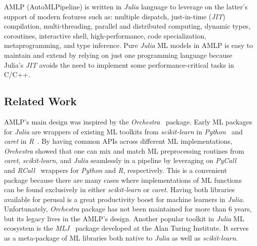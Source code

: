 \documentclass{juliacon}
\begin{document}
AMLP (AutoMLPipeline) is written in \emph{Julia} language \cite{bezanson2017julia} to leverage on the
latter's support of modern features such as: multiple dispatch, just-in-time
(\emph{JIT}) compilation, multi-threading, parallel and distributed computing,
dynamic types, coroutines, interactive shell, high-performance, code specialization,
metaprogramming, and type inference.  Pure \emph{Julia} ML models in AMLP is
easy to maintain and extend by relying on just one programming language
because Julia's \emph{JIT} avoids the need to implement some
performance-critical tasks in C/C++.

\subsection{Related Work}
\label{relatedwork}

AMLP's main design was inspired by the
\emph{Orchestra}~\cite{orchestra2014} package.  Early ML packages for
\emph{Julia} are wrappers of existing ML toolkits from \emph{scikit-learn}  in
\emph{Python}~\cite{python95} and \emph{caret} in \emph{R}~\cite{r13}.  By
having common APIs across different ML implementations, \emph{Orchestra} showed
that one can mix and match ML preprocessing routines from \emph{caret},
\emph{scikit-learn}, and \emph{Julia} seamlessly in a pipeline by leveraging on
\emph{PyCall}~\cite{pycall} and \emph{RCall}~\cite{rcall} wrappers for
\emph{Python} and \emph{R}, respectively. This is a convenient package
because there are many cases where implementations of ML functions can be found
exclusively in either \emph{scikit-learn} or \emph{caret}.  Having both
libraries available for perusal is a great productivity boost for machine
learners in \emph{Julia}. Unfortunately, \emph{Orchestra} package has not been
maintained for more than 6 years, but its legacy lives in the AMLP's
design. Another popular toolkit in \emph{Julia} ML ecosystem is the
\emph{MLJ}~\cite{anthony_blaom_2019_3541506} package developed at the Alan Turing
Institute. It serves as a meta-package of ML libraries both native to \emph{Julia} as
well as \emph{scikit-learn}. 

\vskip 6pt
\end{document}
